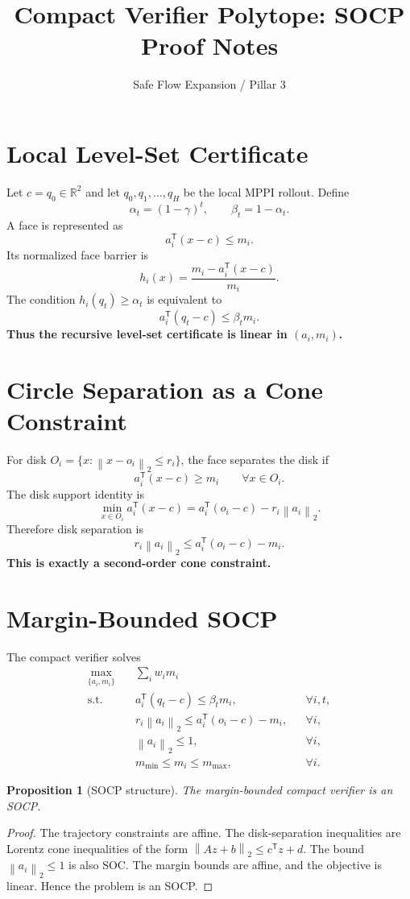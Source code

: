 \documentclass[11pt]{article}
\title{Compact Verifier Polytope: SOCP Proof Notes}
\author{Safe Flow Expansion / Pillar 3}
\date{}
\newtheorem{proposition}{Proposition}
\newcommand{\R}{\mathbb{R}}
\newcommand{\norm}[1]{\left\lVert #1\right\rVert_2}
\newcommand{\trans}{^{\mathsf T}}
\begin{document}
\maketitle

\section{Local Level-Set Certificate}
Let $c=q_0\in\R^2$ and let $q_0,q_1,\ldots,q_H$ be the local MPPI rollout.  Define
\[
    \alpha_t=(1-\gamma)^t,\qquad \beta_t=1-\alpha_t.
\]
A face is represented as
\[
    a_i\trans(x-c)\le m_i.
\]
Its normalized face barrier is
\[
    h_i(x)=\frac{m_i-a_i\trans(x-c)}{m_i}.
\]
The condition $h_i(q_t)\ge\alpha_t$ is equivalent to
\[
    a_i\trans(q_t-c)\le \beta_t m_i.
\]
\textbf{Thus the recursive level-set certificate is linear in $(a_i,m_i)$.}

\section{Circle Separation as a Cone Constraint}
For disk $O_i=\{x:\norm{x-o_i}\le r_i\}$, the face separates the disk if
\[
    a_i\trans(x-c)\ge m_i\qquad\forall x\in O_i.
\]
The disk support identity is
\[
    \min_{x\in O_i}a_i\trans(x-c)=a_i\trans(o_i-c)-r_i\norm{a_i}.
\]
Therefore disk separation is
\[
    r_i\norm{a_i}\le a_i\trans(o_i-c)-m_i.
\]
\textbf{This is exactly a second-order cone constraint.}

\section{Margin-Bounded SOCP}
The compact verifier solves
\begin{align}
    \max_{\{a_i,m_i\}}\quad &\sum_i w_i m_i \\
    \mathrm{s.t.}\quad
    &a_i\trans(q_t-c)\le\beta_t m_i, &&\forall i,t,\\
    &r_i\norm{a_i}\le a_i\trans(o_i-c)-m_i, &&\forall i,\\
    &\norm{a_i}\le1, &&\forall i,\\
    &m_{\min}\le m_i\le m_{\max}, &&\forall i.
\end{align}

\begin{proposition}[SOCP structure]
The margin-bounded compact verifier is an SOCP.
\end{proposition}
\begin{proof}
The trajectory constraints are affine.  The disk-separation inequalities are Lorentz cone inequalities of the form $\norm{Az+b}\le c\trans z+d$.  The bound $\norm{a_i}\le1$ is also SOC.  The margin bounds are affine, and the objective is linear.  Hence the problem is an SOCP.
\end{proof}
\end{document}

